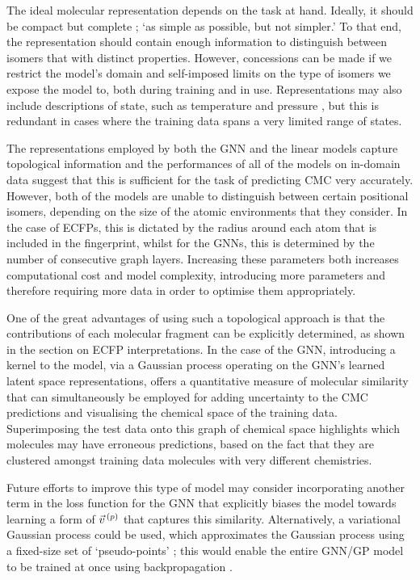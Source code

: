 The ideal molecular
representation depends on the task at hand. Ideally, it should be compact but
complete
\cite{faberCrystalStructureRepresentations2015,himanenDScribeLibraryDescriptors2020};
`as simple as possible, but not simpler.' To that end, the representation should
contain enough information to distinguish between isomers that with distinct
properties. However, concessions can be made if we restrict the model's domain
and self-imposed limits on the type of isomers we expose the model to, both
during training and in use. Representations may also include descriptions of
state, such as temperature and pressure \cite{chenGraphNetworksUniversal2019},
but this is redundant in cases where the training data spans a very limited
range of states.

The representations employed by both the GNN and the linear models capture
topological information and the performances of all of the models on in-domain
data suggest that this is sufficient for the task of predicting CMC very accurately.
However, both of the models are unable to distinguish between certain positional
isomers, depending on the size of the atomic environments that they consider.
In the case of ECFPs, this is dictated by the radius around each atom that
is included in the fingerprint, whilst for the GNNs, this is determined by
the number of consecutive graph layers. Increasing these parameters both
increases computational cost and model complexity, introducing more parameters
and therefore requiring more data in order to optimise them appropriately.

One of the great advantages of using such a topological approach is that the
contributions of each molecular fragment can be explicitly determined, as shown
in the section on ECFP interpretations. In the case of the GNN, introducing a
kernel to the model, via a Gaussian process operating on the GNN's learned
latent space representations, offers a quantitative measure of molecular
similarity that can simultaneously be employed for adding uncertainty to the CMC
predictions and visualising the chemical space of the training data.
Superimposing the test data onto this graph of chemical space highlights which
molecules may have erroneous predictions, based on the fact that they are
clustered amongst training data molecules with very different chemistries.

Future efforts to improve this type of model may consider incorporating another
term in the loss function for the GNN that explicitly biases the model towards
learning a form of $\vec{v}^{\,(p)}{}$ that captures this similarity. Alternatively, a
variational Gaussian process could be used, which approximates the Gaussian
process using a fixed-size set of `pseudo-points'
\cite{hensmanGaussianProcessesBig2013a}; this would enable the entire GNN/GP
model to be trained at once using backpropagation
\cite{moriartyUnlockNNUncertaintyQuantification2022}.